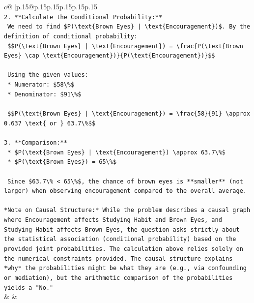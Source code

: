 \documentclass{article}
\begin{document}
{\begin{supertabular}{c@{$\;$}|p{.15\linewidth}@{}p{.15\linewidth}p{.15\linewidth}p{.15\linewidth}p{.15\linewidth}p{.15\linewidth}}
{{{\\ 
\texttt{2.  **Calculate the Conditional Probability:**} \\
\texttt{    We need to find \$P(\textbackslash{}text\{Brown Eyes\} | \textbackslash{}text\{Encouragement\})\$. By the definition of conditional probability:} \\
\texttt{    \$\$P(\textbackslash{}text\{Brown Eyes\} | \textbackslash{}text\{Encouragement\}) = \textbackslash{}frac\{P(\textbackslash{}text\{Brown Eyes\} \textbackslash{}cap \textbackslash{}text\{Encouragement\})\}\{P(\textbackslash{}text\{Encouragement\})\}\$\$} \\
\\ 
\texttt{    Using the given values:} \\
\texttt{    *   Numerator: \$58\textbackslash{}\%\$} \\
\texttt{    *   Denominator: \$91\textbackslash{}\%\$} \\
\\ 
\texttt{    \$\$P(\textbackslash{}text\{Brown Eyes\} | \textbackslash{}text\{Encouragement\}) = \textbackslash{}frac\{58\}\{91\} \textbackslash{}approx 0.637 \textbackslash{}text\{ or \} 63.7\textbackslash{}\%\$\$} \\
\\ 
\texttt{3.  **Comparison:**} \\
\texttt{    *   \$P(\textbackslash{}text\{Brown Eyes\} | \textbackslash{}text\{Encouragement\}) \textbackslash{}approx 63.7\textbackslash{}\%\$} \\
\texttt{    *   \$P(\textbackslash{}text\{Brown Eyes\}) = 65\textbackslash{}\%\$} \\
\\ 
\texttt{    Since \$63.7\textbackslash{}\% < 65\textbackslash{}\%\$, the chance of brown eyes is **smaller** (not larger) when observing encouragement compared to the overall average.} \\
\\ 
\texttt{*Note on Causal Structure:* While the problem describes a causal graph where Encouragement affects Studying Habit and Brown Eyes, and Studying Habit affects Brown Eyes, the question asks strictly about the statistical association (conditional probability) based on the provided joint probabilities. The calculation above relies solely on the numerical constraints provided. The causal structure explains *why* the probabilities might be what they are (e.g., via confounding or mediation), but the arithmetic comparison of the probabilities yields a "No."} \\
            }
        }
    }
    & & \\ \\


\end{supertabular}}
\end{document}
